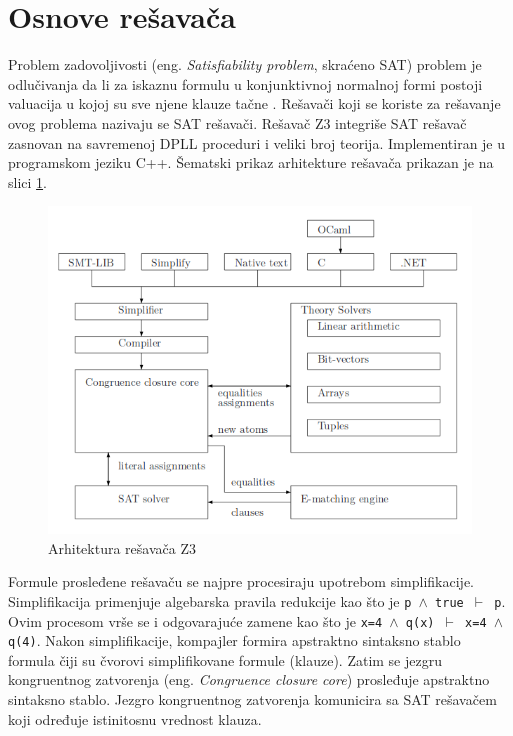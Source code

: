 \documentclass[12pt,oneside]{memoir}
\begin{document}
\section{Osnove rešavača}  \label{sec:num1}
Problem zadovoljivosti (eng. \textit{Satisfiability problem}, skraćeno SAT) problem je odlučivanja da li za iskaznu formulu u konjunktivnoj normalnoj formi postoji valuacija u kojoj su sve njene 
klauze tačne \cite{Handbook}. 
Rešavači koji se koriste za rešavanje ovog problema nazivaju se SAT rešavači.   
Rešavač Z3 integriše SAT rešavač zasnovan na savremenoj DPLL proceduri i veliki broj teorija. 
Implementiran je u programskom jeziku C++. Šematski prikaz arhitekture rešavača \cite{EfficientSMTSolver} prikazan je na slici \ref{fig:arhitektura}. 
\begin{figure}[!ht]
  \centering
  \includegraphics[width=1\textwidth]{arhitektura.png}
  \caption{Arhitektura rešavača Z3}
  \label{fig:arhitektura}
\end{figure}
\par
Formule prosleđene rešavaču se najpre procesiraju upotrebom simplifikacije. Simplifikacija primenjuje algebarska pravila redukcije kao što je \texttt{p $\land$ true $\vdash$ p}. Ovim procesom vrše se i odgovarajuće zamene kao što je \texttt{x=4 $\land$ q(x) $\vdash$ x=4 $\land$ q(4)}.
Nakon simplifikacije, kompajler formira apstraktno sintaksno stablo formula čiji su čvorovi simplifikovane formule (klauze). Zatim se jezgru kongruentnog zatvorenja (eng. 
\textit{Congruence closure core}) prosleđuje apstraktno sintaksno stablo. Jezgro kongruentnog zatvorenja komunicira sa SAT rešavačem koji određuje istinitosnu vrednost klauza. 
\par
\end{document}
